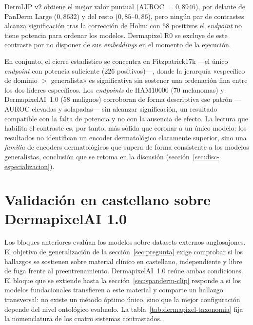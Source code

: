 DermLIP v2 obtiene el mejor valor puntual (AUROC $= 0{,}8946$), por
delante de PanDerm Large ($0{,}8632$) y del resto ($0{,}85$--$0{,}86$),
pero ningún par de contrastes alcanza significación tras la corrección
de Holm: con $58$ positivos el \emph{endpoint} no tiene potencia para
ordenar los modelos. Dermapixel R0 se excluye de este contraste por no
disponer de sus \emph{embeddings} en el momento de la ejecución.

En conjunto, el cierre estadístico se concentra en Fitzpatrick17k ---el
único \emph{endpoint} con potencia suficiente ($226$ positivos)---,
donde la jerarquía «específico de dominio $>$ generalista» es
significativa sin sostener una ordenación fina entre los dos líderes
específicos. Los \emph{endpoints} de HAM10000 ($70$ melanomas) y
DermapixelAI~1.0 ($58$ malignos) corroboran de forma descriptiva ese
patrón ---AUROC elevadas y solapadas--- sin alcanzar significación, un
resultado compatible con la falta de potencia y no con la ausencia de
efecto. La lectura que habilita el contraste es, por tanto, más sólida
que coronar a un único modelo: los resultados no identifican un encoder
dermatológico claramente superior, sino una \emph{familia} de encoders
dermatológicos que supera de forma consistente a los modelos
generalistas, conclusión que se retoma en la discusión
(sección~\ref{sec:disc-especializacion}).

\section{Validación en castellano sobre DermapixelAI 1.0}
\label{sec:dermapixel-results}

Los bloques anteriores evalúan los modelos sobre datasets externos
anglosajones. El objetivo de generalización de la
sección~\ref{sec:pregunta} exige comprobar si los hallazgos se
sostienen sobre material clínico en castellano, independiente y libre
de fuga frente al preentrenamiento. DermapixelAI~1.0 reúne ambas
condiciones. El bloque que se extiende hasta la
sección~\ref{sec:spanderm-clip} responde a si los modelos
fundacionales transfieren a este material y comparte un hallazgo
transversal: no existe un método óptimo único, sino que la mejor
configuración depende del nivel ontológico evaluado. La
tabla~\ref{tab:dermapixel-taxonomia} fija la nomenclatura de los
cuatro sistemas contrastados.

